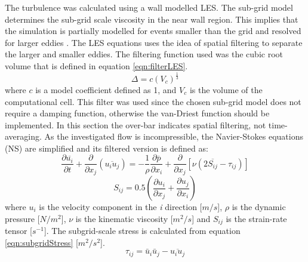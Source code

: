 \begin{refsection}
The turbulence was calculated using a wall modelled LES. The sub-grid model determines the sub-grid scale viscosity in the near wall region. This implies that the simulation is partially modelled for events smaller than the grid and resolved for larger eddies \cite{versteeg2007}. The LES equations uses the idea of spatial filtering to separate the larger and smaller eddies. The filtering function used was the cubic root volume that is defined in equation \ref{eqn:filterLES}.
\begin{equation}
\Delta = c \left( V_c \right)^{\frac{1}{3}}
\label{eqn:filterLES}
\end{equation}
where $c$ is a model coefficient defined as 1, and $V_c$ is the volume of the computational cell. This filter was used since the chosen sub-grid model does not require a damping function, otherwise the van-Driest function should be implemented.
In this section the over-bar indicates spatial filtering, not time-averaging. As the investigated flow is incompressible, the Navier-Stokes equations (NS) are simplified and its filtered version is defined as:
\begin{equation}
\frac{\partial \overline{u_i}}{\partial t}+\frac{\partial }{\partial x_j} \left ( \overline{u_i u_j} \right )= -\frac{1}{\rho}\frac{\partial \overline{p}}{\partial x_i}+\frac{\partial }{\partial x_j} \left [ \nu \left ( 2 \overline{S_{ij}}-\tau_{ij} \right ) \right ]
\label{eqn:LESfiltered}
\end{equation}\begin{equation}
S_{ij}=0.5\left ( \frac{\partial u_i}{\partial x_j}+\frac{\partial u_j}{\partial x_i} \right )
\label{eqn:strainRateTensor}
\end{equation}
where $u_i$ is the velocity component in the \textit{i} direction [$m/s$], $\rho$ is the dynamic pressure [$N/m^2$], $\nu$ is the kinematic viscosity [$m^2/s$] and $S_{ij}$ is the strain-rate tensor [$s^{-1}$]. The subgrid-scale stress is calculated from equation \ref{eqn:subgridStress} [$m^2/s^2$].
\begin{equation}
\tau_{ij}=\bar{u}_i \bar{u}_j-\overline{u_i u_j}
\label{eqn:subgridStress}
\end{equation}


\end{refsection}
